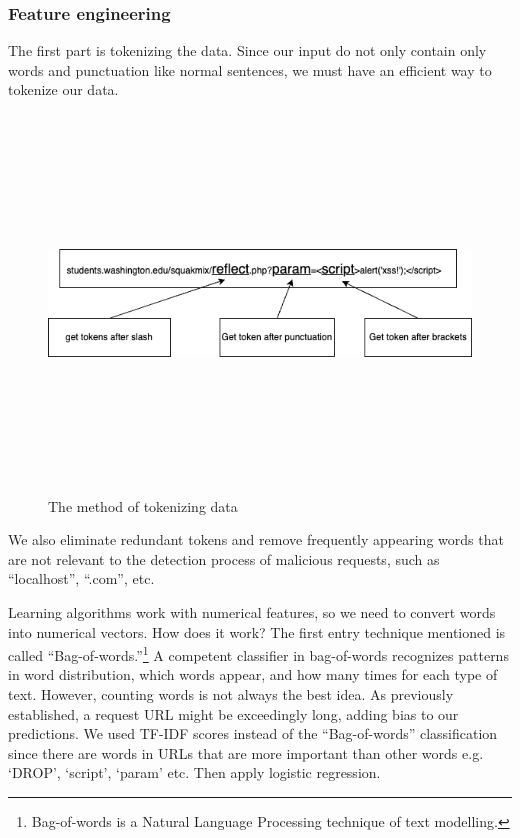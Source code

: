\subsubsection{Feature engineering}
\hspace{0.5cm}The first part is tokenizing the data. Since our input do not only contain only words and punctuation like normal sentences, we must have an efficient way to tokenize our data.

\begin{figure}[!h]
	\centering
	\includegraphics[width=\linewidth, height=10cm,keepaspectratio]{figures/implement1.png}
  \caption{The method of tokenizing data}
\end{figure} 

We also eliminate redundant tokens and remove frequently appearing words that are not relevant to the detection process of malicious requests, such as ``localhost'', ``.com'', etc.

Learning algorithms work with numerical features, so we need to convert words into numerical vectors. How does it work? The first entry technique mentioned is called ``Bag-of-words.''\footnote{Bag-of-words is a Natural Language Processing technique of text modelling.}
A competent classifier in bag-of-words recognizes patterns in word distribution, which words appear, and how many times for each type of text. However, counting words is not always the best idea. As previously established, a request URL might be exceedingly long, adding bias to our predictions. We used TF-IDF scores instead of the ``Bag-of-words'' classification since there are words in URLs that are more important than other words e.g. `DROP', `script', `param' etc. Then apply logistic regression.

